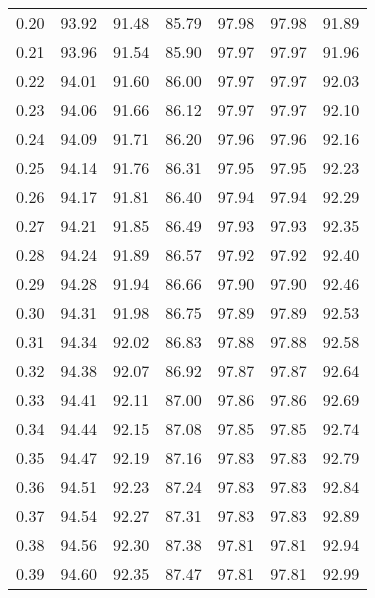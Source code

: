 \begin{tabular}{|c|c|c|c|c|c|c|}
      0.20 &     93.92 &     91.48 &      85.79 &   97.98 &      97.98 &         91.89 \\
      0.21 &     93.96 &     91.54 &      85.90 &   97.97 &      97.97 &         91.96 \\
      0.22 &     94.01 &     91.60 &      86.00 &   97.97 &      97.97 &         92.03 \\
      0.23 &     94.06 &     91.66 &      86.12 &   97.97 &      97.97 &         92.10 \\
      0.24 &     94.09 &     91.71 &      86.20 &   97.96 &      97.96 &         92.16 \\
      0.25 &     94.14 &     91.76 &      86.31 &   97.95 &      97.95 &         92.23 \\
      0.26 &     94.17 &     91.81 &      86.40 &   97.94 &      97.94 &         92.29 \\
      0.27 &     94.21 &     91.85 &      86.49 &   97.93 &      97.93 &         92.35 \\
      0.28 &     94.24 &     91.89 &      86.57 &   97.92 &      97.92 &         92.40 \\
      0.29 &     94.28 &     91.94 &      86.66 &   97.90 &      97.90 &         92.46 \\
      0.30 &     94.31 &     91.98 &      86.75 &   97.89 &      97.89 &         92.53 \\
      0.31 &     94.34 &     92.02 &      86.83 &   97.88 &      97.88 &         92.58 \\
      0.32 &     94.38 &     92.07 &      86.92 &   97.87 &      97.87 &         92.64 \\
      0.33 &     94.41 &     92.11 &      87.00 &   97.86 &      97.86 &         92.69 \\
      0.34 &     94.44 &     92.15 &      87.08 &   97.85 &      97.85 &         92.74 \\
      0.35 &     94.47 &     92.19 &      87.16 &   97.83 &      97.83 &         92.79 \\
      0.36 &     94.51 &     92.23 &      87.24 &   97.83 &      97.83 &         92.84 \\
      0.37 &     94.54 &     92.27 &      87.31 &   97.83 &      97.83 &         92.89 \\
      0.38 &     94.56 &     92.30 &      87.38 &   97.81 &      97.81 &         92.94 \\
      0.39 &     94.60 &     92.35 &      87.47 &   97.81 &      97.81 &         92.99 \\

\end{tabular}

